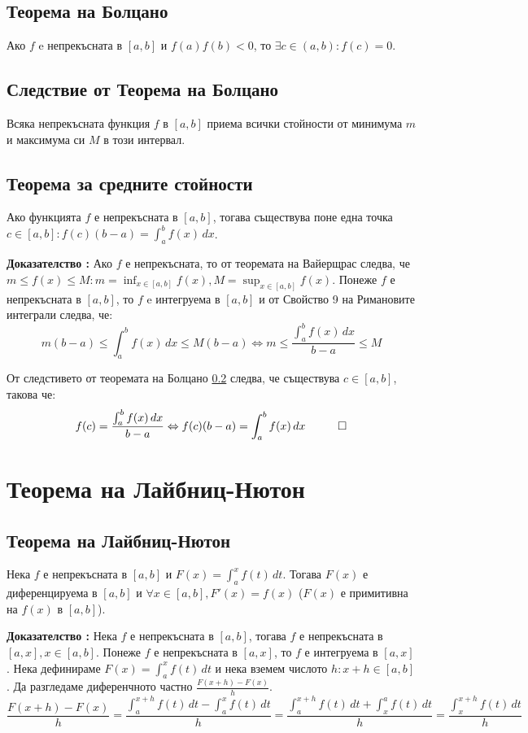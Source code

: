 \documentclass[fleqn,12pt]{article}
\begin{document}
\subsection{Теорема на Болцано}
Ако $f$ e непрекъсната в $[a,b]$ и $f(a)f(b)<0$, то $\exists c \in (a,b): f(c) = 0$.

\subsection{Следствие от Теорема на Болцано} \label{boltzano:extra}
Всяка непрекъсната функция $f$ в $[a,b]$ приема всички стойности от минимума $m$ и максимума си $M$ в този интервал.

\subsection{Теорема за средните стойности}
Ако функцията $f$ е непрекъсната в $[a,b]$, тогава съществува поне една точка $c \in [a,b]: f(c)(b-a) = \int_{a}^{b}  f(x)\,dx$.

\textbf{Доказателство :} Ако $f$ е непрекъсната, то от теоремата на Вайерщрас следва, че $m \leq f(x) \leq M: m = \inf_{x \in [a,b]}f(x), M = \sup_{x \in [a,b]}f(x)$.
Понеже $f$ е непрекъсната в $[a,b]$, то $f$ e интегруема в $[a,b]$ и от Свойство 9 на Римановите интеграли следва, че:
\[ m(b-a) \leq \int_{a}^{b}  f(x)\,dx \leq M(b-a) \Leftrightarrow m \leq \frac{\int_{a}^{b} f(x)\,dx}{b-a} \leq M \] 

От следстивето от теоремата на Болцано \ref{boltzano:extra} следва, че съществува $c \in [a,b]$, такова че: 
\[ f(c) = \frac{\int_{a}^{b} f(x)\,dx}{b-a} \Leftrightarrow f(c)(b-a) = \int_{a}^{b}  f(x)\,dx \hspace{10mm} \square \]

\section{Теорема на Лайбниц-Нютон}
\subsection{Теорема на Лайбниц-Нютон}
Нека $f$ е непрекъсната в $[a,b]$ и $F(x)=\int_{a}^{x} f(t)\,dt$. Тогава $F(x)$ е диференцируема в $[a,b]$ и $\forall x \in [a,b], F'(x)=f(x)$ ($F(x)$ е примитивна на $f(x)$ в $[a,b]$).

\textbf{Доказателство :} Нека $f$ е непрекъсната в $[a,b]$, тогава $f$ е непрекъсната в $[a,x], x \in [a,b]$. Понеже  $f$ е непрекъсната в $[a,x]$, то $f$ е интегруема в $[a,x]$.
Нека дефинираме $F(x)=\int_{a}^{x} f(t)\,dt$ и нека вземем числото $h: x+h\in[a,b]$. Да разгледаме диференчното частно $\frac{F(x+h)-F(x)}{h}$.
\[\frac{F(x+h)-F(x)}{h} = \frac{\int_{a}^{x+h} f(t)\,dt - \int_{a}^{x} f(t)\,dt}{h} = \frac{\int_{a}^{x+h} f(t)\,dt + \int_{x}^{a} f(t)\,dt}{h} = \frac{\int_{x}^{x+h} f(t)\,dt}{h} \]
\end{document}
